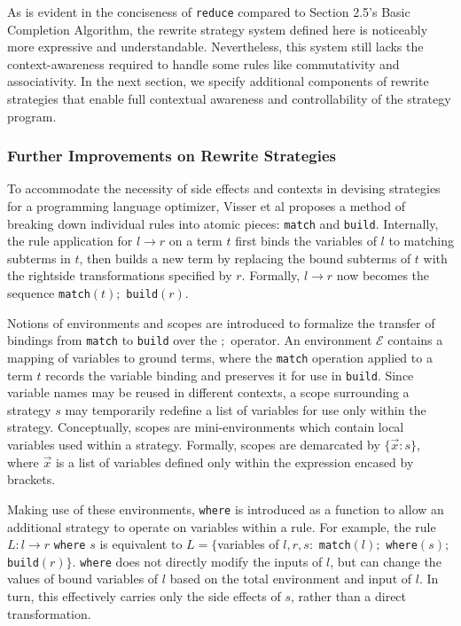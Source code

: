 \documentclass{article}
\begin{document}
As is evident in the conciseness of \texttt{reduce} compared to Section 2.5's Basic Completion Algorithm,
the rewrite strategy system defined here is noticeably more expressive and understandable.
Nevertheless, this system still lacks the context-awareness required to handle some rules like commutativity and associativity.
In the next section, we specify additional components of rewrite strategies that enable full contextual awareness
and controllability of the strategy program.

\subsubsection{Further Improvements on Rewrite Strategies}
To accommodate the necessity of side effects and contexts in devising strategies for a programming language optimizer,
Visser et al \cite{elco1998building} proposes a method of breaking down individual rules into atomic pieces: \texttt{match} and \texttt{build}.
Internally, the rule application for $l \rightarrow r$ on a term $t$ first binds the variables of $l$ to matching subterms in $t$,
then builds a new term by replacing the bound subterms of $t$ with the rightside transformations specified by $r$. Formally,
$l \rightarrow r$ now becomes the sequence \texttt{match}$(t);$ \texttt{build}$(r)$.

Notions of environments and scopes are introduced to formalize the transfer of bindings from \texttt{match} to \texttt{build} over the $;$ operator.
An environment $\mathcal{E}$ contains a mapping of variables to ground terms,
where the \texttt{match} operation applied to a term $t$ records the variable binding and preserves it for use in \texttt{build}.
Since variable names may be reused in different contexts, a scope surrounding a strategy $s$ may temporarily redefine a list of variables
for use only within the strategy. Conceptually, scopes are mini-environments which contain local variables used within a strategy.
Formally, scopes are demarcated by $\{\vec{x}: s\}$, where $\vec{x}$ is a list of variables defined only within the expression encased by brackets.

Making use of these environments, \texttt{where} is introduced as a function to allow an additional strategy to operate on variables within a rule.
For example, the rule $L: l \rightarrow r$ \texttt{where} $s$ is equivalent to
$L = \{$variables of $l,r,s:$ \texttt{match}$(l);$ \texttt{where}$(s);$ \texttt{build}$(r)\}$.
\texttt{where} does not directly modify the inputs of $l$,
but can change the values of bound variables of $l$ based on the total environment and input of $l$.
In turn, this effectively carries only the side effects of $s$, rather than a direct transformation.
\end{document}
